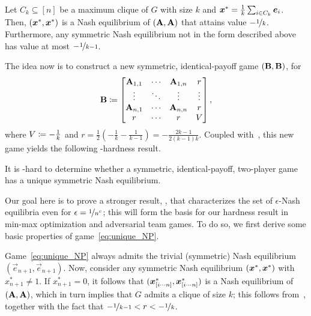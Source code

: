 \begin{lemma}
    \label{lemma:Nashgap}
    Let $C_k \subseteq [n]$ be a maximum clique of $G$ with size $k$ and ${\bm{x}}^* = \frac{1}{k} \sum_{i \in C_k} {\bm{e}}_{i}$. Then, $({\bm{x}}^*, {\bm{x}}^*)$ is a Nash equilibrium of $(\mathbf{A}, \mathbf{A})$ that attains value $-\nicefrac{1}{k}$. Furthermore, any symmetric Nash equilibrium not in the form described above has value at most $- \nicefrac{1}{k - 1}$.
\end{lemma}
The idea now is to construct a new symmetric, identical-payoff game $(\mathbf{B}, \mathbf{B})$, for
    \begin{align}
        \mathbf{B} \coloneqq \begin{bmatrix}
         \mathbf{A}_{1, 1} & \cdots & \mathbf{A}_{1, n}  & r\\
         \vdots & \ddots & \vdots & \vdots \\
         \mathbf{A}_{n, 1} & \cdots & \mathbf{A}_{n,n} & r\\
         r & \cdots & r  & V\\
    \end{bmatrix}, \label{eq:unique_NP}
    \end{align}
    where $V \coloneqq - \frac{1}{k}$ and $r = \frac{1}{2} (- \frac{1}{k} - \frac{1}{k - 1}) = -\frac{2k-1}{2(k - 1)k}$. Coupled with~, this new game yields the following \NP-hardness result.

\begin{theorem}
    \label{theorem:knownNP}
    It is \NP-hard to determine whether a symmetric, identical-payoff, two-player game has a unique symmetric Nash equilibrium.
\end{theorem}

Our goal here is to prove a stronger result, , that characterizes the set of $\epsilon$-Nash equilibria even for $\epsilon = \nicefrac{1}{n^c}$; this will form the basis for our hardness result in min-max optimization and adversarial team games. To do so, we first derive some basic properties of game~\eqref{eq:unique_NP}.%

Game~\eqref{eq:unique_NP} always admits the trivial (symmetric) Nash equilibrium $(\vec{e}_{n+1}, \vec{e}_{n+1})$. Now, consider any symmetric Nash equilibrium $({\bm{x}}^*, {\bm{x}}^*)$ with $x^*_{n+1} \neq 1$. If $x^*_{n+1} = 0$, it follows that $({\bm{x}}^*_{[i \cdots n] }, {\bm{x}}^*_{[i \cdots n]})$ is a Nash equilibrium of $(\mathbf{A}, \mathbf{A})$, which in turn implies that $G$ admits a clique of size $k$; this follows from~, together with the fact that $- \nicefrac{1}{k - 1} < r < -\nicefrac{1}{k}$.

